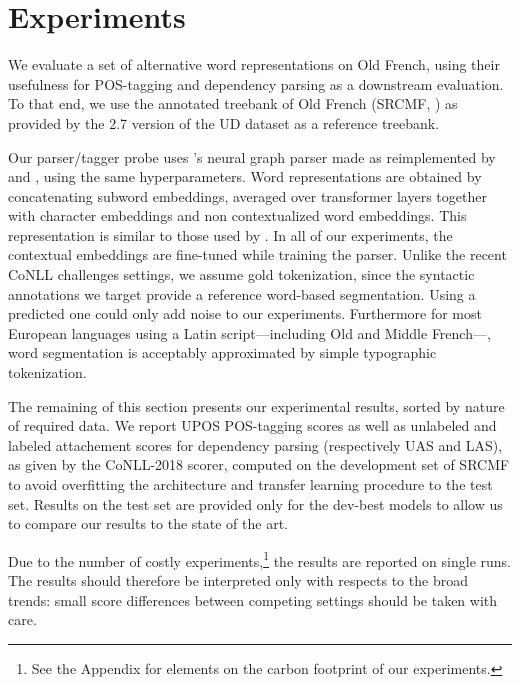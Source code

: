 \section{Experiments}
\label{sec-experiments}
We evaluate a set of alternative word representations on Old French, using their usefulness for POS-tagging and dependency parsing as a downstream evaluation.
To that end, we use the annotated treebank of Old French (SRCMF,  \citet{prevost-stein-2013-syntactic}) as provided by the 2.7 version of the UD dataset \citep{zeman2020UniversalDependenciesa} as a reference treebank.

Our parser/tagger probe uses \citet{dozat-manning-2018-simpler}'s neural graph parser made as reimplemented by \citet{le-etal-2020-flaubert} and \citet{grobol:hal-03223424}, using the same hyperparameters.
Word representations are obtained by concatenating subword embeddings, averaged over transformer layers together with character embeddings and non contextualized word embeddings.  %
This representation is similar to those used by \citet{straka-strakova-2019-evaluating,ling-etal-2015-finding}.
In all of our experiments, the contextual embeddings are fine-tuned while training the parser.
Unlike the recent CoNLL challenges settings, we assume gold tokenization, since the syntactic annotations we target provide a reference word-based segmentation. Using a predicted one could only add noise to our experiments.
Furthermore for most European languages using a Latin script---including Old and Middle French---, word segmentation is acceptably approximated by simple typographic tokenization.

The remaining of this section presents our experimental results, sorted by nature of required data.
We report UPOS POS-tagging scores as well as unlabeled and labeled attachement scores for dependency parsing (respectively UAS and LAS), as given by the CoNLL-2018 scorer, computed on the development set of SRCMF to avoid overfitting the architecture and transfer learning procedure to the test set.
Results on the test set are provided only for the dev-best models to allow us to compare our results to the state of the art.

Due to the number of costly experiments,\footnote{See the Appendix for elements on the carbon footprint of our experiments.} the results are reported on single runs.
The results should therefore be interpreted  only with respects to the broad trends: small score differences between competing settings should be taken with care.

